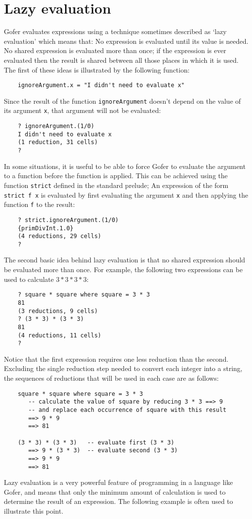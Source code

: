 \section{Lazy evaluation}
Gofer evaluates expressions using a technique  sometimes  described  as
`lazy evaluation' which means that:
\BSI
\IT  No expression is evaluated until its value is needed.
\IT  No  shared  expression  is  evaluated  more  than  once;  if   the
     expression is ever evaluated then the result is shared between all
     those places in which it is used.
\ESI
The first of these ideas is illustrated by the following function:
\begin{verbatim}
    ignoreArgument.x = "I didn't need to evaluate x"
\end{verbatim}
Since the result of the function \verb"ignoreArgument" doesn't depend on the
value of its argument \verb"x", that argument will not be evaluated:
\begin{verbatim}
    ? ignoreArgument.(1/0)
    I didn't need to evaluate x
    (1 reduction, 31 cells)
    ?
\end{verbatim}
In some situations, it is useful to be able to force Gofer to  evaluate
the argument to a function before the function is applied.  This can be
achieved using the function \verb"strict" defined in the  standard  prelude;
An expression of the form \verb"strict f x" is evaluated by first evaluating
the argument \verb"x" and then applying the function \verb"f" to the result:
\begin{verbatim}
    ? strict.ignoreArgument.(1/0)
    {primDivInt.1.0}
    (4 reductions, 29 cells)
    ?
\end{verbatim}
The second  basic  idea  behind  lazy  evaluation  is  that  no  shared
expression should be  evaluated  more  than  once.   For  example,  the
following two expressions can be used to calculate $3*3*3*3$:
\begin{verbatim}
    ? square * square where square = 3 * 3
    81
    (3 reductions, 9 cells)
    ? (3 * 3) * (3 * 3)
    81
    (4 reductions, 11 cells)
    ?
\end{verbatim}
Notice that the first expression requires one less reduction  than  the
second.  Excluding the single reduction step  needed  to  convert  each
integer into a string, the sequences of reductions that will be used in
each case are as follows:
\begin{verbatim}
    square * square where square = 3 * 3
       -- calculate the value of square by reducing 3 * 3 ==> 9
       -- and replace each occurrence of square with this result
       ==> 9 * 9
       ==> 81

    (3 * 3) * (3 * 3)   -- evaluate first (3 * 3)
       ==> 9 * (3 * 3)  -- evaluate second (3 * 3)
       ==> 9 * 9
       ==> 81
\end{verbatim}
Lazy evaluation is a very powerful feature of programming in a language
like Gofer, and means that only the minimum amount  of  calculation  is
used to determine the result of an expression.  The  following  example
is often used to illustrate this point.

